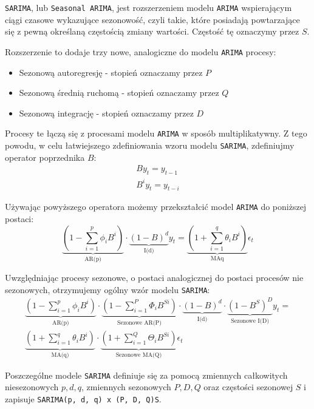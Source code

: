 \documentclass[12pt]{article}
\begin{document}
\texttt{SARIMA}, lub \texttt{Seasonal ARIMA}, jest rozszerzeniem modelu \texttt{ARIMA} wspierającym ciągi czasowe wykazujące sezonowość, czyli takie, które posiadają powtarzające się z pewną określaną częstością zmiany wartości. Częstość tę oznaczymy przez $S$.

Rozszerzenie to dodaje trzy nowe, analogiczne do modelu \texttt{ARIMA} procesy:
\begin{itemize}
    \item Sezonową autoregresję - stopień oznaczamy przez $P$
    \item Sezonową średnią ruchomą - stopień oznaczamy przez $Q$
    \item Sezonową integrację - stopień oznaczamy przez $D$
\end{itemize}
Procesy te łączą się z procesami modelu \texttt{ARIMA} w sposób multiplikatywny. Z tego powodu, w celu łatwiejszego zdefiniowania wzoru modelu \texttt{SARIMA}, zdefiniujmy operator poprzednika $B$:
\begin{gather*}
    By_t = y_{t-1} \\
    B^iy_t = y_{t-i}
\end{gather*}

Używając powyższego operatora możemy przekształcić model \texttt{ARIMA} do poniższej postaci:
\[
    \underbrace{\left(1 - \sum^p_{i=1} \phi_iB^i \right)}_\text{AR(p)}
    \cdot
    \underbrace{(1 - B)^d}_\text{I(d)}
    y_t =
    \underbrace{\left(1 + \sum^q_{i=1} \theta_iB^i \right)}_\text{MA{q}}
    \epsilon_t
\]

Uwzględniając procesy sezonowe, o postaci analogicznej do postaci procesów nie sezonowych, otrzymujemy ogólny wzór modelu \texttt{SARIMA}:
\begin{gather*}
    \underbrace{\left(1 - \sum^p_{i=1} \phi_iB^i \right)}_\text{AR(p)}
    \cdot
    \underbrace{\left(1 - \sum^P_{i=1} \Phi_iB^{Si} \right)}_\text{Sezonowe AR(P)}
    \cdot
    \underbrace{(1 - B)^d}_\text{I(d)}
    \cdot
    \underbrace{(1 - B^S)^D}_\text{Sezonowe I(D)}
    y_t = \\
    \underbrace{\left(1 + \sum^q_{i=1} \theta_iB^i \right)}_\text{MA(q)}
    \cdot
    \underbrace{\left(1 + \sum^Q_{i=1} \Theta_iB^{Si} \right)}_\text{Sezonowe MA(Q)}
    \epsilon_t
\end{gather*}

Poszczególne modele \texttt{SARIMA} definiuje się za pomocą zmiennych całkowitych niesezonowych $p, d, q$, zmiennych sezonowych $P, D, Q$ oraz częstości sezonowej $S$ i zapisuje \texttt{SARIMA(p, d, q) x (P, D, Q)S}.
\end{document}
